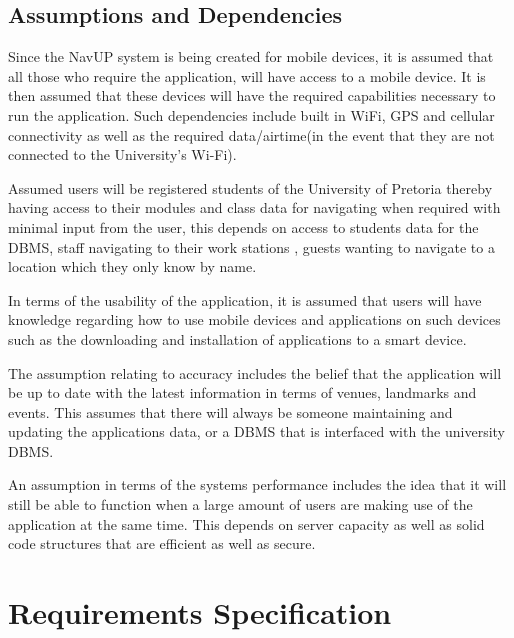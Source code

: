 \documentclass[11pt, a4paper]{article}
\begin{document}
	\subsection{Assumptions and Dependencies}
	Since the NavUP system is being created for mobile devices,  it is assumed that all those who require the application,  will have access to a mobile device. It is then assumed that these devices will have the required capabilities necessary to run the application. Such dependencies include built in WiFi,  GPS and cellular connectivity as well as the required data/airtime(in the event that they are not connected to the University's Wi-Fi).
\\
\par
Assumed users will be registered students of the University of Pretoria thereby having access to their modules and class data for navigating when required with minimal input from the user, this depends on access to students data for the DBMS, staff navigating to their work stations , guests wanting to navigate to a location which they only know by name.
\\
\par
In terms of the usability of the application,  it is assumed that users will have knowledge regarding how to use mobile devices and applications on such devices such as the downloading and installation of applications to a smart device.
\\
\par
The assumption relating to accuracy includes the belief that the application will be up to date with the latest information in terms of venues,  landmarks and events. This assumes that there will always be someone maintaining and updating the applications data,  or a DBMS that is interfaced with the university DBMS.  
\\
\par
An assumption in terms of the systems performance includes the idea that it will still be able to function when a large amount of users are making use of the application at the same time. This depends on server capacity as well as solid code structures that are efficient as well as secure.

	
\newpage
\section{Requirements Specification}		
\end{document}
